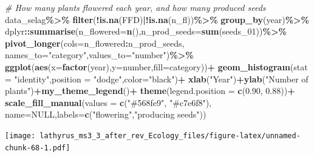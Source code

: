\documentclass[
]{article}
\newenvironment{Shaded}{\begin{snugshade}}{\end{snugshade}}
\newcommand{\CommentTok}[1]{\textcolor[rgb]{0.56,0.35,0.01}{\textit{#1}}}
\newcommand{\DataTypeTok}[1]{\textcolor[rgb]{0.13,0.29,0.53}{#1}}
\newcommand{\DecValTok}[1]{\textcolor[rgb]{0.00,0.00,0.81}{#1}}
\newcommand{\FloatTok}[1]{\textcolor[rgb]{0.00,0.00,0.81}{#1}}
\newcommand{\KeywordTok}[1]{\textcolor[rgb]{0.13,0.29,0.53}{\textbf{#1}}}
\newcommand{\NormalTok}[1]{#1}
\newcommand{\OperatorTok}[1]{\textcolor[rgb]{0.81,0.36,0.00}{\textbf{#1}}}
\newcommand{\OtherTok}[1]{\textcolor[rgb]{0.56,0.35,0.01}{#1}}
\newcommand{\StringTok}[1]{\textcolor[rgb]{0.31,0.60,0.02}{#1}}
\begin{document}
\begin{Shaded}
\begin{Highlighting}[]
\CommentTok{\# How many plants flowered each year, and how many produced seeds}
\NormalTok{data\_selag}\OperatorTok{\%\textgreater{}\%}
\StringTok{  }\KeywordTok{filter}\NormalTok{(}\OperatorTok{!}\KeywordTok{is.na}\NormalTok{(FFD)}\OperatorTok{|!}\KeywordTok{is.na}\NormalTok{(n\_fl))}\OperatorTok{\%\textgreater{}\%}
\StringTok{  }\KeywordTok{group\_by}\NormalTok{(year)}\OperatorTok{\%\textgreater{}\%}
\StringTok{  }\NormalTok{dplyr}\OperatorTok{::}\KeywordTok{summarise}\NormalTok{(}\DataTypeTok{n\_flowered=}\KeywordTok{n}\NormalTok{(),}\DataTypeTok{n\_prod\_seeds=}\KeywordTok{sum}\NormalTok{(seeds\_}\DecValTok{01}\NormalTok{))}\OperatorTok{\%\textgreater{}\%}
\StringTok{  }\KeywordTok{pivot\_longer}\NormalTok{(}\DataTypeTok{cols=}\NormalTok{n\_flowered}\OperatorTok{:}\NormalTok{n\_prod\_seeds,}
               \DataTypeTok{names\_to=}\StringTok{"category"}\NormalTok{,}\DataTypeTok{values\_to=}\StringTok{"number"}\NormalTok{)}\OperatorTok{\%\textgreater{}\%}
\StringTok{  }\KeywordTok{ggplot}\NormalTok{(}\KeywordTok{aes}\NormalTok{(}\DataTypeTok{x=}\KeywordTok{factor}\NormalTok{(year),}\DataTypeTok{y=}\NormalTok{number,}\DataTypeTok{fill=}\NormalTok{category))}\OperatorTok{+}
\StringTok{  }\KeywordTok{geom\_histogram}\NormalTok{(}\DataTypeTok{stat =} \StringTok{"identity"}\NormalTok{,}\DataTypeTok{position =} \StringTok{"dodge"}\NormalTok{,}\DataTypeTok{color=}\StringTok{"black"}\NormalTok{)}\OperatorTok{+}
\StringTok{  }\KeywordTok{xlab}\NormalTok{(}\StringTok{"Year"}\NormalTok{)}\OperatorTok{+}\KeywordTok{ylab}\NormalTok{(}\StringTok{"Number of plants"}\NormalTok{)}\OperatorTok{+}\KeywordTok{my\_theme\_legend}\NormalTok{()}\OperatorTok{+}
\StringTok{  }\KeywordTok{theme}\NormalTok{(}\DataTypeTok{legend.position =} \KeywordTok{c}\NormalTok{(}\FloatTok{0.90}\NormalTok{, }\FloatTok{0.88}\NormalTok{))}\OperatorTok{+}
\StringTok{  }\KeywordTok{scale\_fill\_manual}\NormalTok{(}\DataTypeTok{values =} \KeywordTok{c}\NormalTok{(}\StringTok{"\#568fe9"}\NormalTok{, }\StringTok{"\#c7e6f8"}\NormalTok{),}
                    \DataTypeTok{name=}\OtherTok{NULL}\NormalTok{,}\DataTypeTok{labels=}\KeywordTok{c}\NormalTok{(}\StringTok{"flowering"}\NormalTok{,}\StringTok{"producing seeds"}\NormalTok{))}
\end{Highlighting}
\end{Shaded}

\texttt{[image: lathyrus\_ms3\_3\_after\_rev\_Ecology\_files/figure-latex/unnamed-chunk-68-1.pdf]}
\end{document}
